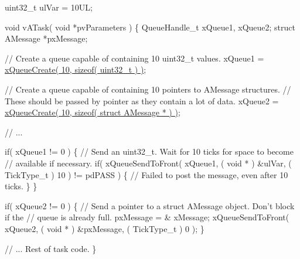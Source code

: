 \begin{DoxyPre}uint32\_t ulVar = 10UL;\end{DoxyPre}



\begin{DoxyPre}void vATask( void *pvParameters )
\{
QueueHandle\_t xQueue1, xQueue2;
struct AMessage *pxMessage;\end{DoxyPre}



\begin{DoxyPre}   // Create a queue capable of containing 10 uint32\_t values.
   xQueue1 = \hyperlink{queue_8h_aeb858b824bd74a934ea7ebb81af2a6bb}{xQueueCreate( 10, sizeof( uint32\_t ) )};\end{DoxyPre}



\begin{DoxyPre}   // Create a queue capable of containing 10 pointers to AMessage structures.
   // These should be passed by pointer as they contain a lot of data.
   xQueue2 = \hyperlink{queue_8h_aeb858b824bd74a934ea7ebb81af2a6bb}{xQueueCreate( 10, sizeof( struct AMessage * ) )};\end{DoxyPre}



\begin{DoxyPre}   // ...\end{DoxyPre}



\begin{DoxyPre}   if( xQueue1 != 0 )
   \{
    // Send an uint32\_t.  Wait for 10 ticks for space to become
    // available if necessary.
    if( xQueueSendToFront( xQueue1, ( void * ) \&ulVar, ( TickType\_t ) 10 ) != pdPASS )
    \{
        // Failed to post the message, even after 10 ticks.
    \}
   \}\end{DoxyPre}



\begin{DoxyPre}   if( xQueue2 != 0 )
   \{
    // Send a pointer to a struct AMessage object.  Don't block if the
    // queue is already full.
    pxMessage = \& xMessage;
    xQueueSendToFront( xQueue2, ( void * ) \&pxMessage, ( TickType\_t ) 0 );
   \}\end{DoxyPre}



\begin{DoxyPre}   // ... Rest of task code.
\}
\end{DoxyPre}


